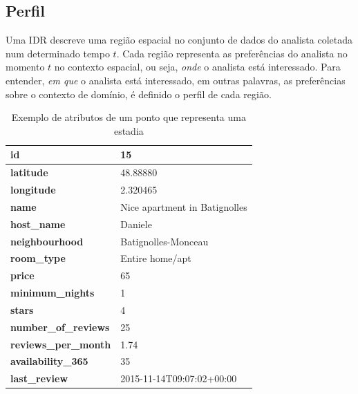 
\subsection{Perfil}

Uma IDR descreve uma região espacial no conjunto de dados do analista coletada num determinado tempo $t$. Cada região representa as preferências do analista no momento $t$ no contexto espacial, ou seja, {\em onde} o analista está interessado. Para entender, {\em em que} o analista está interessado, em outras palavras, as preferências sobre o contexto de domínio, é definido o perfil de cada região.

\begin{table}[]
	\centering
	\begin{tabular}{|l|l|}
		\hline
		\textbf{id}                  & 15                             \\ \hline
		\textbf{latitude}            & 48.88880                       \\ \hline
		\textbf{longitude}           & 2.320465                       \\ \hline
		\textbf{name}                & Nice apartment in Batignolles \\ \hline
		\textbf{host\_name}          & Daniele                        \\ \hline
		\textbf{neighbourhood}       & Batignolles-Monceau            \\ \hline
		\textbf{room\_type}          & Entire home/apt                \\ \hline
		\textbf{price}               & 65                             \\ \hline
		\textbf{minimum\_nights}     & 1                              \\ \hline
		\textbf{stars}               & 4                              \\ \hline
		\textbf{number\_of\_reviews} & 25                             \\ \hline
		\textbf{reviews\_per\_month} & 1.74                           \\ \hline
		\textbf{availability\_365}   & 35                             \\ \hline
		\textbf{last\_review}        & 2015-11-14T09:07:02+00:00      \\ \hline
	\end{tabular}
	\caption{Exemplo de atributos de um ponto que representa uma estadia}
	\label{table:atributos}
\end{table}

